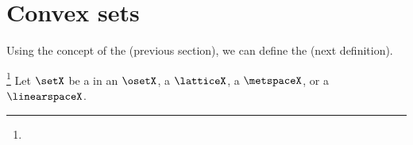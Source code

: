 \begin{definition}
\end{definition}

\section{Convex sets}
Using the concept of the  (previous section),
we can define the  (next definition).
\begin{definition}
\footnote{
  }
\label{def:convex_set}
Let $\setX$ be a  in an  $\osetX$, a  $\latticeX$, 
  a  $\metspaceX$, or a  $\linearspaceX$.
\end{definition}




